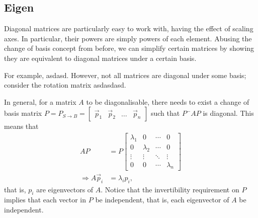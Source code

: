 \documentclass{article}
\theoremstyle{definition}
\begin{document}
\subsection{Eigen}
Diagonal matrices are particularly easy to work with, having the effect of scaling axes. In particular, their powers are simply powers of each element. Abusing the change of basis concept from before, we can simplify certain matrices by showing they are equivalent to diagonal matrices under a certain basis.\par
For example, asdasd. However, not all matrices are diagonal under some basis; consider the rotation matrix asdasdasd. \par
In general, for a matrix $A$ to be diagonalisable, there needs to exist a change of basis matrix $P=P_{S\rightarrow B}=\begin{bmatrix}\vec p_1&\vec p_2&\dots&\vec p_n\end{bmatrix}$ such that $P^-AP$ is diagonal. This means that 
\begin{align*}
	AP&=P\begin{bmatrix}\lambda_1&0&\cdots&0\\0&\lambda_2&\cdots&0\\\vdots&\vdots&\ddots&\vdots\\0&0&\cdots&\lambda_n\end{bmatrix}\\
	\Rightarrow A\vec p_i&=\lambda_ip_i,
\end{align*}
that is, $p_i$ are eigenvectors of $A$. Notice that the invertibility requirement on $P$ implies that each vector in $P$ be independent, that is, each eigenvector of $A$ be independent.
\newpage
\end{document}
